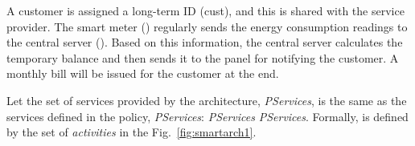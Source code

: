 \documentclass[a4paper]{article}
\begin{document}
A customer is assigned a long-term ID (cust), and this is shared with the service provider. The smart meter () regularly sends the energy consumption readings to the central server (). Based on this information, the central server calculates the temporary balance and then sends it to the panel for notifying the customer.  A monthly bill will be issued for the customer at the end.      

Let the set of services provided by the architecture, \textit{PServices}, is the same as the services defined in the policy, \textit{PServices}: \textit{PServices}  \textit{PServices}. Formally,  is defined by the set of \textit{activities} in the Fig.~\ref{fig:smartarch1}.  

\begin{figure}[htbp]
\centering
{}
\end{figure}
\end{document}
